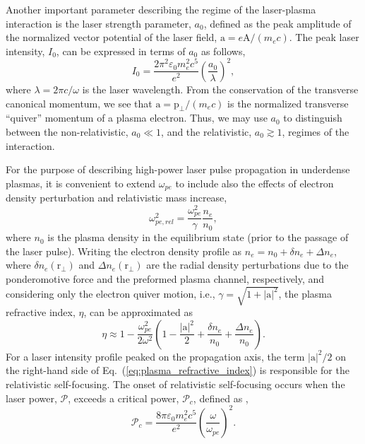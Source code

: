 \documentclass[10pt, a4paper, twoside, openright]{report}
\newcommand{\q}[1]{``#1''} %
\newcommand{\norm}[1]{|#1|}
\renewcommand{\vec}[1]{\boldsymbol{\mathrm{#1}}}
\begin{document}
Another important parameter describing the regime of the laser-plasma interaction is the laser strength parameter, $ a_0 $, defined as the peak amplitude of the normalized vector potential of the laser field, $ \vec{a} = e \vec{A} / \left( m_e c \right) $. The peak laser intensity, $ I_0 $, can be expressed in terms of $ a_0 $ as follows,
\begin{equation}\label{eq:laser_intensity}
	I_0 = \frac{2 \pi^2 \varepsilon_0 m_e^2 c^5}{e^2} \left( \frac{a_0}{\lambda} \right)^2,
\end{equation} 
where $ \lambda = 2 \pi c / \omega $ is the laser wavelength. From the conservation of the transverse canonical momentum, we see that $ \vec{a} = \vec{p}_{\bot} / \left( m_e c \right) $ is the normalized transverse \q{quiver} momentum of a plasma electron. Thus, we may use $ a_0 $ to distinguish between the non-relativistic, $ a_0 \ll 1 $, and the relativistic, $ a_0 \gtrsim 1 $, regimes of the interaction. %

For the purpose of describing high-power laser pulse propagation in underdense plasmas, it is convenient to extend $ \omega_{pe} $ to include also the effects of electron density perturbation and relativistic mass increase,
\begin{equation}\label{eq:langmuir_freq_rel}
	\omega_{pe, rel}^2 = \frac{\omega_{pe}^2}{\gamma} \frac{n_e}{n_0},
\end{equation}
where $ n_0 $ is the plasma density in the equilibrium state (prior to the passage of the laser pulse). Writing the electron density profile as $ n_e = n_0 + \delta n_e + \Delta n_e $, where $ \delta n_e \left( \vec{r}_{\bot} \right) $ and $ \Delta n_e \left( \vec{r}_{\bot} \right) $ are the radial density perturbations due to the ponderomotive force and the preformed plasma channel, respectively, and considering only the electron quiver motion, i.e., $ \gamma = \sqrt{1 + \norm{\vec{a}}^2} $, the plasma refractive index, $ \eta $, can be approximated as \cite{Esarey1997}
\begin{equation}\label{eq:plasma_refractive_index}
	\eta \approx 1 - \frac{\omega_{pe}^2}{2 \omega^2} \left( 1 - \frac{\norm{\vec{a}}^2}{2} + \frac{\delta n_e}{n_0} + \frac{\Delta n_e}{n_0} \right).
\end{equation}
For a laser intensity profile peaked on the propagation axis, the term $ \norm{\vec{a}}^2 / 2 $ on the right-hand side of Eq.~(\ref{eq:plasma_refractive_index}) is responsible for the relativistic self-focusing. The onset of relativistic self-focusing occurs when the laser power, $ \mathcal{P} $, exceeds a critical power, $ \mathcal{P}_c $, defined as \cite{Sun1987},
\begin{equation}\label{eq:critical_power}
	\mathcal{P}_c = \frac{8 \pi \varepsilon_0 m_e^2 c^5}{e^2} \left( \frac{\omega}{\omega_{pe}} \right)^2.
\end{equation}
\end{document}
